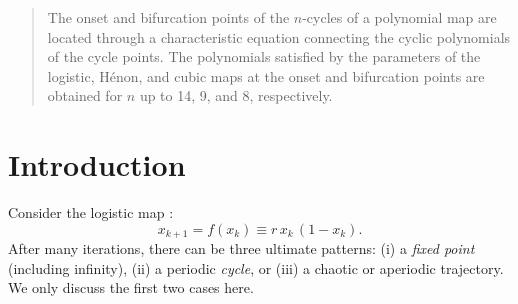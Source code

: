 \documentclass{ws-ijbc}
\begin{document}
\begin{abstract}
The onset and bifurcation points of the $n$-cycles of
  a polynomial map are located
  through a characteristic equation
  connecting the cyclic polynomials of the cycle points.
The polynomials satisfied by the parameters
  of the logistic, H\'enon, and cubic maps
  at the onset and bifurcation points are obtained
  for $n$ up to 14, 9, and 8,
  respectively.
\end{abstract}





%
%
\section{Introduction}
%
%

Consider the logistic map \cite{may, strogatz}:
%
\begin{equation}
  x_{k+1} = f(x_k) \equiv r \, x_k \, ( 1 - x_k ).
\label{eq:logmap}
\end{equation}
%
%
%
%
%
After many iterations, there can be three ultimate patterns:
  (i) a \emph{fixed point} (including infinity),
  (ii) a periodic \emph{cycle},
or
  (iii) a chaotic or aperiodic trajectory.
We only discuss the first two cases here.
\end{document}
